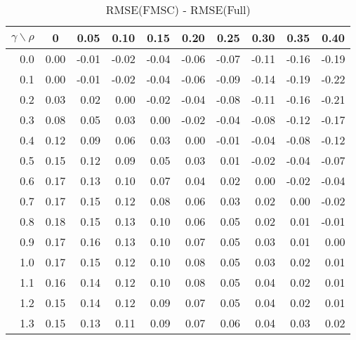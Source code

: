\documentclass[12pt]{article}
\begin{document}
\begin{table}[!tbp]
\caption{RMSE(FMSC) - RMSE(Full)}
 \begin{center}
 \begin{tabular}{r|rrrrrrrrr}\hline\hline
\multicolumn{1}{c|}{$\gamma\backslash\rho$}&\multicolumn{1}{c}{0}&\multicolumn{1}{c}{0.05}&\multicolumn{1}{c}{0.10}&\multicolumn{1}{c}{0.15}&\multicolumn{1}{c}{0.20}&\multicolumn{1}{c}{0.25}&\multicolumn{1}{c}{0.30}&\multicolumn{1}{c}{0.35}&\multicolumn{1}{c}{0.40}\tabularnewline
\hline

0.0&0.00&-0.01&-0.02&-0.04&-0.06&-0.07&-0.11&-0.16&-0.19\tabularnewline
0.1&0.00&-0.01&-0.02&-0.04&-0.06&-0.09&-0.14&-0.19&-0.22\tabularnewline
0.2&0.03& 0.02& 0.00&-0.02&-0.04&-0.08&-0.11&-0.16&-0.21\tabularnewline
0.3&0.08& 0.05& 0.03& 0.00&-0.02&-0.04&-0.08&-0.12&-0.17\tabularnewline
0.4&0.12& 0.09& 0.06& 0.03& 0.00&-0.01&-0.04&-0.08&-0.12\tabularnewline
0.5&0.15& 0.12& 0.09& 0.05& 0.03& 0.01&-0.02&-0.04&-0.07\tabularnewline
0.6&0.17& 0.13& 0.10& 0.07& 0.04& 0.02& 0.00&-0.02&-0.04\tabularnewline
0.7&0.17& 0.15& 0.12& 0.08& 0.06& 0.03& 0.02& 0.00&-0.02\tabularnewline
0.8&0.18& 0.15& 0.13& 0.10& 0.06& 0.05& 0.02& 0.01&-0.01\tabularnewline
0.9&0.17& 0.16& 0.13& 0.10& 0.07& 0.05& 0.03& 0.01& 0.00\tabularnewline
1.0&0.17& 0.15& 0.12& 0.10& 0.08& 0.05& 0.03& 0.02& 0.01\tabularnewline
1.1&0.16& 0.14& 0.12& 0.10& 0.08& 0.05& 0.04& 0.02& 0.01\tabularnewline
1.2&0.15& 0.14& 0.12& 0.09& 0.07& 0.05& 0.04& 0.02& 0.01\tabularnewline
1.3&0.15& 0.13& 0.11& 0.09& 0.07& 0.06& 0.04& 0.03& 0.02\tabularnewline
\hline
\end{tabular}

\end{center}

\end{table}

%
\end{document}

